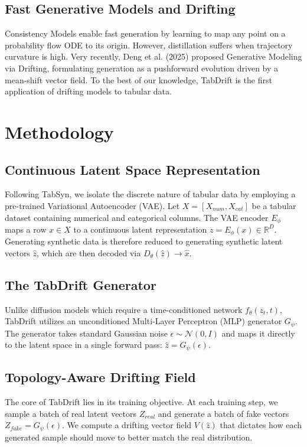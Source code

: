 \documentclass[10pt,journal,compsoc]{IEEEtran}
\begin{document}
\subsection{Fast Generative Models and Drifting}
Consistency Models enable fast generation by learning to map any point on a probability flow ODE to its origin. However, distillation suffers when trajectory curvature is high. Very recently, Deng et al. (2025) proposed Generative Modeling via Drifting, formulating generation as a pushforward evolution driven by a mean-shift vector field. To the best of our knowledge, TabDrift is the first application of drifting models to tabular data.

\section{Methodology}
\subsection{Continuous Latent Space Representation}
Following TabSyn, we isolate the discrete nature of tabular data by employing a pre-trained Variational Autoencoder (VAE). Let $X = [X_{num}, X_{cat}]$ be a tabular dataset containing numerical and categorical columns. The VAE encoder $E_\phi$ maps a row $x \in X$ to a continuous latent representation $z = E_\phi(x) \in \mathbb{R}^D$. Generating synthetic data is therefore reduced to generating synthetic latent vectors $\hat{z}$, which are then decoded via $D_\theta(\hat{z}) \to \hat{x}$.

\subsection{The TabDrift Generator}
Unlike diffusion models which require a time-conditioned network $f_\theta(z_t, t)$, TabDrift utilizes an unconditioned Multi-Layer Perceptron (MLP) generator $G_\psi$. The generator takes standard Gaussian noise $\epsilon \sim \mathcal{N}(0, I)$ and maps it directly to the latent space in a single forward pass: $\hat{z} = G_\psi(\epsilon)$.

\subsection{Topology-Aware Drifting Field}
The core of TabDrift lies in its training objective. At each training step, we sample a batch of real latent vectors $Z_{real}$ and generate a batch of fake vectors $Z_{fake} = G_\psi(\epsilon)$. We compute a drifting vector field $V(\hat{z})$ that dictates how each generated sample should move to better match the real distribution.
\end{document}
